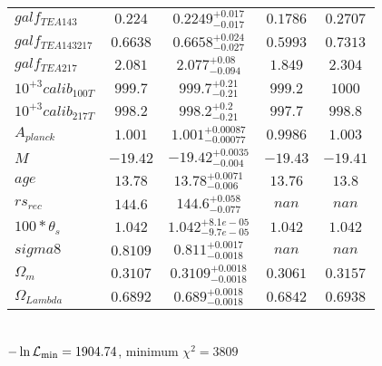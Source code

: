 \begin{tabular}{|l|c|c|c|c|}
$galf_{TE A 143 }$ &$0.224$ & $0.2249_{-0.017}^{+0.017}$ & $0.1786$ & $0.2707$ \\ 
$galf_{TE A 143 217 }$ &$0.6638$ & $0.6658_{-0.027}^{+0.024}$ & $0.5993$ & $0.7313$ \\ 
$galf_{TE A 217 }$ &$2.081$ & $2.077_{-0.094}^{+0.08}$ & $1.849$ & $2.304$ \\ 
$10^{+3}calib_{100T }$ &$999.7$ & $999.7_{-0.21}^{+0.21}$ & $999.2$ & $1000$ \\ 
$10^{+3}calib_{217T }$ &$998.2$ & $998.2_{-0.21}^{+0.2}$ & $997.7$ & $998.8$ \\ 
$A_{planck }$ &$1.001$ & $1.001_{-0.00077}^{+0.00087}$ & $0.9986$ & $1.003$ \\ 
$M$ &$-19.42$ & $-19.42_{-0.004}^{+0.0035}$ & $-19.43$ & $-19.41$ \\ 
$age$ &$13.78$ & $13.78_{-0.006}^{+0.0071}$ & $13.76$ & $13.8$ \\ 
$rs_{rec }$ &$144.6$ & $144.6_{-0.077}^{+0.058}$ & $nan$ & $nan$ \\ 
$100*\theta{}_{s }$ &$1.042$ & $1.042_{-9.7e-05}^{+8.1e-05}$ & $1.042$ & $1.042$ \\ 
$sigma8$ &$0.8109$ & $0.811_{-0.0018}^{+0.0017}$ & $nan$ & $nan$ \\ 
$\Omega{}_{m }$ &$0.3107$ & $0.3109_{-0.0018}^{+0.0018}$ & $0.3061$ & $0.3157$ \\ 
$\Omega{}_{Lambda }$ &$0.6892$ & $0.689_{-0.0018}^{+0.0018}$ & $0.6842$ & $0.6938$ \\ 
\hline 
 \end{tabular} \\ 
$-\ln{\cal L}_\mathrm{min} =1904.74$, minimum $\chi^2=3809$ \\ 
